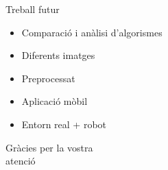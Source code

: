\documentclass[xcolor=table, 11pt]{beamer}
\newcommand\tz{\fontsize{13}{15.6}\selectfont}
\begin{document}
	\begin{frame}{Treball futur}
		\tz
		\begin{itemize}
			\item{Comparació i anàlisi d'algorismes}
			\item{Diferents imatges}
			\item{Preprocessat}
			\item{Aplicació mòbil}
			\item{Entorn real + robot}
		\end{itemize}
	\end{frame}

	\begin{frame}
		\Huge{Gràcies per la vostra\\atenció}
	\end{frame}

	\appendix

	\begin{frame}[allowframebreaks]
		\printbibliography
	\end{frame}
\end{document}
